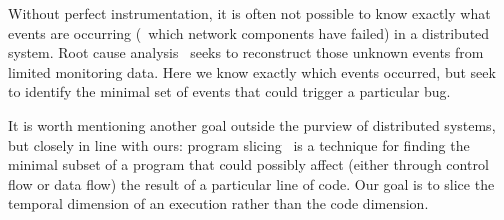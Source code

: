 \vspace{0.05in}
 Without perfect instrumentation,
it is often not possible to know exactly what events are occurring (\eg~which
network components have failed) in a
distributed system. Root cause analysis~\cite{yemini1996,Kandula:2009:DDE:1592568.1592597}
seeks to reconstruct those unknown events from limited monitoring data.
Here we know exactly which events occurred, but
seek to identify the minimal set of events that could trigger a particular bug.

\vspace{0.05in}
It is worth mentioning another goal outside the purview of distributed systems, but
closely in line with ours: program slicing~\cite{weiser1981program} is a
technique for finding the
minimal subset of a program that could possibly affect (either through control flow or data
flow) the result of a particular line of code.
Our goal is to slice the temporal dimension of an execution rather than the
code dimension.

